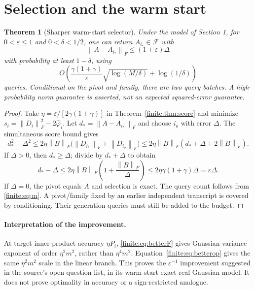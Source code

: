\documentclass[11pt,oneside,openany,a4paper]{book}
\numberwithin{equation}{chapter}
\newtheorem{theorem}{Theorem}[chapter]
\theoremstyle{definition}
\theoremstyle{remark}
\newcommand{\F}[1]{\left\lVert#1\right\rVert_F}
\begin{document}
\clearpage
\section{Selection and the warm start}
\begin{theorem}[Sharper warm-start selector]\label{finite:thm:main}
Under the model of Section 1, for $0<\varepsilon\le1$ and $0<\delta<1/2$, one can return $A_{i_*}\in\mathcal F$ with
\[
\F{A-A_{i_*}}\le(1+\varepsilon)\Delta
\]
with probability at least $1-\delta$, using
\begin{equation}\label{finite:eq:main}
\boxed{O\!\left(\frac{\gamma(1+\gamma)}{\varepsilon}
\sqrt{\log(M/\delta)}+\log(1/\delta)\right)}
\end{equation}
queries. Conditional on the pivot and family, there are two query batches. A high-probability norm guarantee is asserted, not an expected squared-error guarantee.
\end{theorem}
\begin{proof}
Take $\eta=\varepsilon/[2\gamma(1+\gamma)]$ in Theorem~\ref{finite:thm:score} and minimize
$s_i=\F{D_i}^2-2\widehat\varphi_i$.
Let $d_* =\F{A-A_{i_*}}$ and choose $i_o$ with error $\Delta$. The simultaneous score bound gives
\[
d_*^2-\Delta^2
\le2\eta\F B\bigl(\F{D_{i_*}}+\F{D_{i_o}}\bigr)
\le2\eta\F B(d_*+\Delta+2\F B).
\]
If $\Delta>0$, then $d_*\ge\Delta$; divide by $d_*+\Delta$ to obtain
\[
d_*-\Delta\le2\eta\F B\left(1+\frac{\F B}{\Delta}\right)
\le2\eta\gamma(1+\gamma)\Delta=\varepsilon\Delta.
\]
If $\Delta=0$, the pivot equals $A$ and selection is exact. The query count follows from \eqref{finite:eq:m}. A pivot/family fixed by an earlier independent transcript is covered by conditioning. Their generation queries must still be added to the budget.
\end{proof}

\paragraph{Interpretation of the improvement.}
At target inner-product accuracy $\eta P_i$, \eqref{finite:eq:betterF} gives Gaussian variance exponent of order $\eta^2m^2$, rather than $\eta^4m^2$. Equation~\eqref{finite:eq:betterop} gives the same $\eta^2m^2$ scale in the linear branch. This proves the $\varepsilon^{-1}$ improvement suggested in the source's open-question list, in its warm-start exact-real Gaussian model. It does not prove optimality in accuracy or a sign-restricted analogue.
\end{document}
